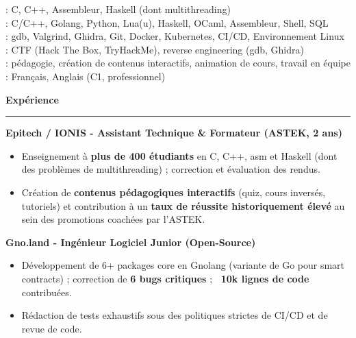 \documentclass[9pt]{extarticle}
\begin{document}
\hspace*{5pt}{\bfseries Enseignés (ASTEK)}: C, C++, Assembleur, Haskell (dont multithreading)
\\
\hspace*{5pt}{\bfseries Maîtrise}: C/C++, Golang, Python, Lua(u), Haskell, OCaml, Assembleur, Shell, SQL
\\
\hspace*{5pt}{\bfseries Outils}: gdb, Valgrind, Ghidra, Git, Docker, Kubernetes, CI/CD, Environnement Linux
\\
\hspace*{5pt}{\bfseries Sécurité}: CTF (Hack The Box, TryHackMe), reverse engineering (gdb, Ghidra)
\\
\hspace*{5pt}{\bfseries Transverses}: pédagogie, création de contenus interactifs, animation de cours, travail en équipe
\\
\hspace*{5pt}{\bfseries Langues}: Français, Anglais (C1, professionnel)

\par\vspace{5pt}


{\large\bfseries Expérience}
\par\vspace{-8pt}
\rule{\linewidth}{0.4pt}
\par\vspace{5pt}

{\bfseries Epitech / IONIS - Assistant Technique \& Formateur (ASTEK, 2 ans)}
\begin{itemize}[noitemsep, topsep=0pt]
	\item Enseignement à {\bfseries plus de 400 étudiants} en C, C++, asm et Haskell (dont des problèmes de multithreading) ; correction et évaluation des rendus.
	\item Création de {\bfseries contenus pédagogiques interactifs} (quiz, cours inversés, tutoriels) et contribution à un {\bfseries taux de réussite historiquement élevé} au sein des promotions coachées par l'ASTEK.
\end{itemize}

\par\vspace{5pt}

{\bfseries Gno.land - Ingénieur Logiciel Junior (Open-Source)}
\begin{itemize}[noitemsep, topsep=0pt]
	\item Développement de 6+ packages core en Gnolang (variante de Go pour smart contracts) ; correction de {\bfseries 6 bugs critiques} ; {\bfseries ~10k lignes de code} contribuées.
	\item Rédaction de tests exhaustifs sous des politiques strictes de CI/CD et de revue de code.
\end{itemize}
\end{document}
